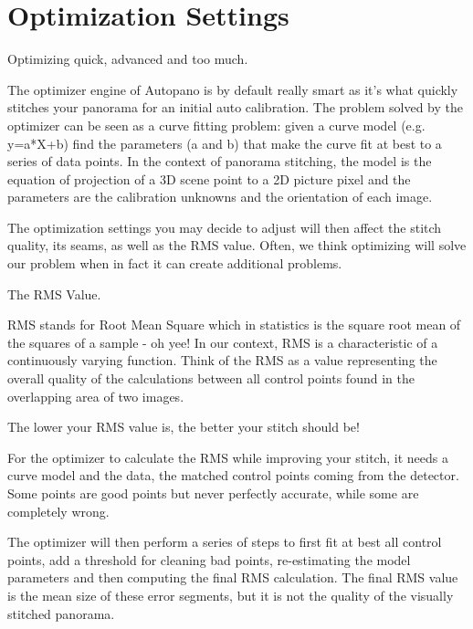 \section{Optimization Settings}
\pagecolor{white}
\label{chap:35}
\begin{fullwidth}

\problem

{\large Optimizing quick, advanced and too much. \par}

The optimizer engine of Autopano is by default really smart as it’s what quickly stitches your panorama for an initial auto calibration. The problem solved by the optimizer can be seen as a curve fitting problem: given a curve model (e.g. y=a*X+b) find the parameters (a and b) that make the curve fit at best to a series of data points. In the context of panorama stitching, the model is the equation of projection of a 3D scene point to a 2D picture pixel and the parameters are the calibration unknowns and the orientation of each image.

The optimization settings you may decide to adjust will then affect the stitch quality, its seams, as well as the RMS value. Often, we think optimizing will solve our problem when in fact it can create additional problems.

\solution

{\large The RMS Value. \par}

RMS stands for Root Mean Square which in statistics is the square root mean of the squares of a sample - oh yee! In our context, RMS is a characteristic of a continuously varying function. Think of the RMS as a value representing the overall quality of the calculations between all control points found in the overlapping area of two images.

The lower your RMS value is, the better your stitch should be!


For the optimizer to calculate the RMS while improving your stitch, it needs a curve model and the data, the matched control points coming from the detector. Some points are good points but never perfectly accurate, while some are completely wrong. 

The optimizer will then perform a series of steps to first fit at best all control points, add a threshold for cleaning bad points, re-estimating the model parameters and then computing the final RMS calculation. The final RMS value is the mean size of these error segments, but it is not the quality of the visually stitched panorama.


\end{fullwidth}
